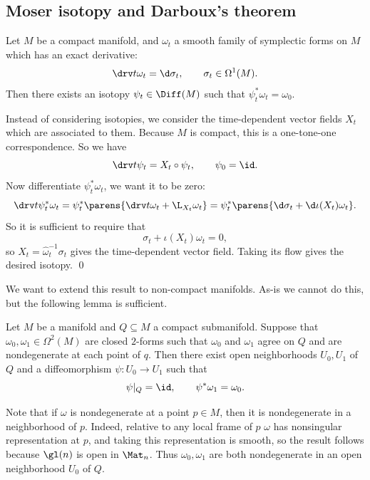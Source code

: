 \subsection{Moser isotopy and Darboux's theorem}

\blemm[title={Moser isotopy, compact}, name={mosercompactisotopy}]

    Let $M$ be a compact manifold, and $\omega_t$ a smooth family of symplectic forms on $M$ which has an exact derivative:
    $$ \drv t\omega_t = \d\sigma_t,\qquad \sigma_t\in\Omega^1(M) . $$
    Then there exists an isotopy $\psi_t\in\Diff(M)$ such that $\psi_t^*\omega_t=\omega_0$.

\elemm

\bproof

    Instead of considering isotopies, we consider the time-dependent vector fields $X_t$ which are associated to them.
    Because $M$ is compact, this is a one-tone-one correspondence.
    So we have
    $$ \drv t\psi_t = X_t\circ\psi_t,\qquad \psi_0 = \id . $$
    Now differentiate $\psi_t^*\omega_t$, we want it to be zero:
    $$ \drv t\psi_t^*\omega_t = \psi_t^*\parens{\drv t\omega_t + \L_{X_t}\omega_t} = \psi_t^*\parens{\d\sigma_t + \d\iota(X_t)\omega_t} . $$
    So it is sufficient to require that
    $$ \sigma_t + \iota(X_t)\omega_t = 0 , $$
    so $X_t=\hat\omega_t^{-1}\sigma_t$ gives the time-dependent vector field.
    Taking its flow gives the desired isotopy.
    \qed

\eproof

We want to extend this result to non-compact manifolds.
As-is we cannot do this, but the following lemma is sufficient.

\blemm[title={Moser isotopy}, name={moserisotopy}]

    Let $M$ be a manifold and $Q\subseteq M$ a compact submanifold.
    Suppose that $\omega_0,\omega_1\in\Omega^2(M)$ are closed $2$-forms such that $\omega_0$ and $\omega_1$ agree on $Q$ and are nondegenerate at each point of $q$.
    Then there exist open neighborhoods $U_0,U_1$ of $Q$ and a diffeomorphism $\psi\colon U_0\to U_1$ such that
    $$ \psi|_Q = \id,\qquad \psi^*\omega_1 = \omega_0 . $$

\elemm

\bproof

    Note that if $\omega$ is nondegenerate at a point $p\in M$, then it is nondegenerate in a neighborhood of $p$.
    Indeed, relative to any local frame of $p$ $\omega$ has nonsingular representation at $p$, and taking this representation is smooth, so the result follows
    because $\gl(n)$ is open in $\Mat_n$.
    Thus $\omega_0,\omega_1$ are both nondegenerate in an open neighborhood $U_0$ of $Q$.

